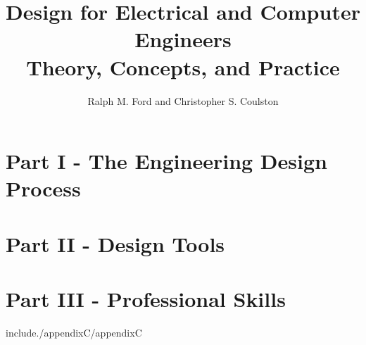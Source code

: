 \documentclass[letterpaper, 10pt]{memoir}
\begin{document}
\frontmatter
\title{{\Huge Design for Electrical and Computer Engineers} \\
				Theory, Concepts, and Practice}
\author{Ralph M. Ford and Christopher S. Coulston}
\date{}
\maketitle




\tableofcontents

\mainmatter 					%

\chapter*{Part I - The Engineering Design Process }













\chapter*{Part II - Design Tools}













\chapter*{Part III - Professional Skills}












\appendix





include{./appendixC/appendixC}





\printindex
\end{document}
